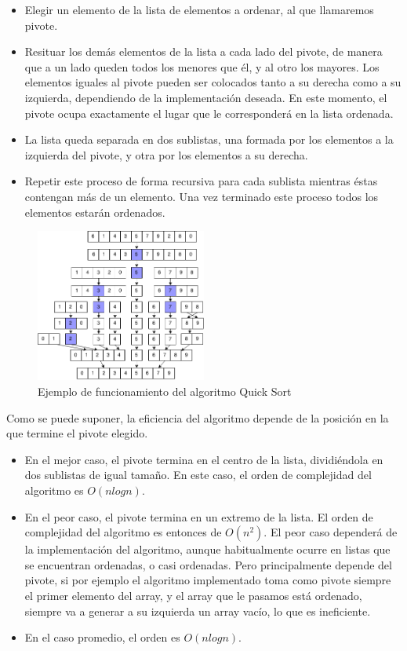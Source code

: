 \documentclass[8pt, A4]{article}    %
\begin{document}
\begin{itemize}
    \item Elegir un elemento de la lista de elementos a ordenar, al que llamaremos pivote.
    \item Resituar los demás elementos de la lista a cada lado del pivote, de manera que a un lado queden todos los menores que él, y al otro los mayores. Los elementos iguales al pivote pueden ser colocados tanto a su derecha como a su izquierda, dependiendo de la implementación deseada. En este momento, el pivote ocupa exactamente el lugar que le corresponderá en la lista ordenada.
    \item La lista queda separada en dos sublistas, una formada por los elementos a la izquierda del pivote, y otra por los elementos a su derecha.
    \item Repetir este proceso de forma recursiva para cada sublista mientras éstas contengan más de un elemento. Una vez terminado este proceso todos los elementos estarán ordenados.
\end{itemize}

\begin{figure}[h]
\begin{center}
\includegraphics[width=0.5\textwidth]{graph/quick-sort-info}
\end{center}
\caption{Ejemplo de funcionamiento del algoritmo Quick Sort}
\label{fig:QuickSortInfo}
\end{figure}

Como se puede suponer, la eficiencia del algoritmo depende de la posición en la que termine el pivote elegido.

\begin{itemize}
    \item En el mejor caso, el pivote termina en el centro de la lista, dividiéndola en dos sublistas de igual tamaño. En este caso, el orden de complejidad del algoritmo es $O(nlog n)$.
    \item En el peor caso, el pivote termina en un extremo de la lista. El orden de complejidad del algoritmo es entonces de $O(n^2)$. El peor caso dependerá de la implementación del algoritmo, aunque habitualmente ocurre en listas que se encuentran ordenadas, o casi ordenadas. Pero principalmente depende del pivote, si por ejemplo el algoritmo implementado toma como pivote siempre el primer elemento del array, y el array que le pasamos está ordenado, siempre va a generar a su izquierda un array vacío, lo que es ineficiente.

    \item En el caso promedio, el orden es $O(nlog n)$.
\end{itemize}
\end{document}
